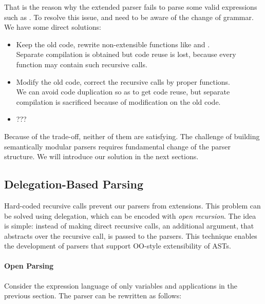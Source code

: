 That is the reason why the extended parser fails to parse some valid expressions such as  . To resolve this issue,  and  need to be aware of the change of grammar. We have some direct solutions:

\begin{itemize}
    \item Keep the old code, rewrite non-extensible functions like  and . \\Separate compilation is obtained but code reuse is lost, because every function may contain such recursive calls.
    \item Modify the old code, correct the recursive calls by proper functions. \\We can avoid code duplication so as to get code reuse, but separate compilation is sacrificed because of modification on the old code.
    \item ??? 
\end{itemize}

Because of the trade-off, neither of them are satisfying. The challenge of building semantically modular parsers requires fundamental change of the parser structure. We will introduce our solution in the next sections.

\subsection{Delegation-Based Parsing}\label{subsec:overview-delegation}

Hard-coded recursive calls prevent our parsers from extensions.
This problem can be solved using delegation, which can be encoded with
\textit{open recursion}. The idea is simple: instead of making direct
recursive calls, an additional argument, that abstracts over the
recursive call, is passed to the parsers. This technique enables the
development of parsers that support OO-style extensibility of ASTs.

\paragraph{Open Parsing} Consider the expression language of only variables and applications in the previous section. The parser can be rewritten as follows:


